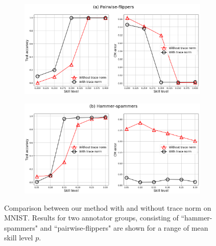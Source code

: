 \begin{figure}[ht]
	\center
	\hfill
	\begin{subfigure}[]{0.49\linewidth}
		\includegraphics[width=\linewidth]{chapter_4/figures/figures_new/figure_04.png}
	\end{subfigure}
	\begin{subfigure}[]{0.49\linewidth}
		\includegraphics[width=\linewidth]{chapter_4/figures/figures_new/figure_05.png}
	\end{subfigure}
	
	\caption{Comparison between our method with and without trace norm  on MNIST. Results for two annotator groups, consisting of ``hammer-spammers" and ``pairwise-flippers" are shown for a range of mean skill level $p$.  }
	\label{fig:ablation_trace}
\end{figure}



